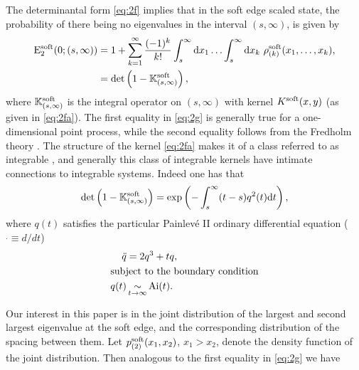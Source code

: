 \documentclass[10pt,reqno]{amsart}
\theoremstyle{plain}
\theoremstyle{definition}
\theoremstyle{remark}
\begin{document}
The determinantal form \eqref{eq:2f} implies that in the soft edge scaled state, the probability of there being 
no eigenvalues in the interval $(s,\infty)$, is given by \cite{Fo_1993}
\begin{align}
 {\rm E}_2^{\rm soft}(0;(s,\infty)) 
       & =   1 + \sum_{k=1}^{\infty} \frac{ (-1)^k}{k!} \int_{s}^{\infty} {\rm d}x_1 \ldots \int_{s}^{\infty} {\rm d}x_k  \ \rho_{(k)}^{\rm soft}(x_1,\ldots,x_k) , \notag \\
       & =    \det \left(1 - {\mathbb K}^{\rm soft}_{(s,\infty)}\right),													 
\label{eq:2g}
\end{align}
where $ {\mathbb K}^{\rm soft}_{(s,\infty)} $ is the integral operator on $(s,\infty)$ with kernel $K^{\rm soft}(x,y)$ (as given in \eqref{eq:2fa}). The first 
equality in \eqref{eq:2g} is generally true for a one-dimensional point process, while the second equality follows from the Fredholm theory 
\cite{WW_1958}.
The structure of the kernel \eqref{eq:2fa} makes it of a class referred to as integrable \cite{IIKS_1990}, and generally this class of integrable 
kernels have intimate connections to integrable systems. Indeed one has that \cite{TW_1994a}
\begin{align}
 \det \left(1 - {\mathbb K}^{\rm soft}_{(s,\infty)}\right) = 
 	\exp\left( - \int_s^{\infty}(t-s) q^2(t) {\rm d}t \right),	 
\label{eq:3.1} 
 \end{align}
where $q(t) $ satisfies the particular Painlev\'e II ordinary differential equation ($\;\dot{}\equiv d/dt$)
\begin{align}
 \ddot{q} & = 2q^3+tq ,
\label{eq:4.1} \\
\noalign{\hbox{subject to the boundary condition}}
q(t) & \mathop{\sim}_{t \rightarrow \infty} {\rm Ai}(t).				 
\label{eq:4.1a}
\end{align}

Our interest in this paper is in the joint distribution of the largest and second largest eigenvalue at the soft edge, and the corresponding 
distribution of the spacing between them. Let $p_{(2)}^{\rm soft}(x_1,x_2)$, $x_1>x_2$, denote the density function of the joint distribution. 
Then analogous to the first equality in \eqref{eq:2g} we have
\end{document}
